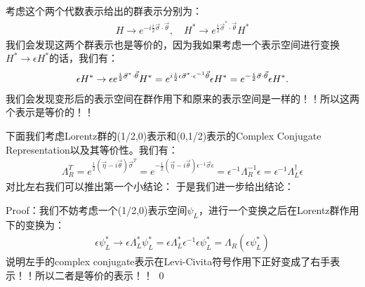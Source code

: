     考虑这个两个代数表示给出的群表示分别为：
    \begin{align}
      H\to e^{-i\frac{i}{2}\vec{\sigma}\cdot\vec{\theta}}, \quad
      H^*\to e^{\frac{i}{2}\vec{\sigma}^*\cdot\vec{\theta}}H^*
    \end{align}
    我们会发现这两个群表示也是等价的，因为我如果考虑一个表示空间进行变换$ H^* \to \epsilon H^* $的话，我们有：
    \begin{align}
      \large\epsilon H^*\to\epsilon
      e^{\frac{i}{2}\vec{\sigma}^*\cdot\vec{\theta}}H^*=e^{i\frac{i}{2}\epsilon\vec{\sigma}^*\cdot\epsilon^{-1}\vec{\theta}}\epsilon
      H^*=e^{-\frac{i}{2}\vec{\sigma}\cdot\vec{\theta}}\epsilon H^*.
    \end{align}
    我们会发现变形后的表示空间在群作用下和原来的表示空间是一样的！！所以这两个表示是等价的！！

    \bigskip

    下面我们考虑Lorentz群的(1/2,0)表示和(0,1/2)表示的Complex Conjugate
    Representation以及其等价性。我们有：
    \begin{align}
      \Lambda_R^T=e^{\frac{1}{2}(\vec{\eta}-i\vec{\theta})\vec{\sigma}^T}=e^{-\frac{1}{2}(\vec{\eta}-i\vec{\theta})\epsilon^{-1}\vec{\sigma}\epsilon}=\epsilon^{-1}\Lambda_R^{-1}\epsilon=\epsilon^{-1}\Lambda_L^\dagger\epsilon
    \end{align}
    对比左右我们可以推出第一个小结论：
    于是我们进一步给出结论：

    Proof：我们不妨考虑一个(1/2,0)表示空间$ \psi_L $，进行一个变换之后在Lorentz群作用下的变换为：
    \begin{align}
      \epsilon\psi_L^* \to
      \epsilon\Lambda_L^*\psi_L^*=\epsilon\Lambda_L^*\epsilon^{-1}\epsilon\psi_L^*=\Lambda_R(\epsilon\psi_L^*)
    \end{align}
    说明左手的complex conjugate表示在Levi-Civita符号作用下正好变成了右手表示！！所以二者是等价的表示！！
    \qed

